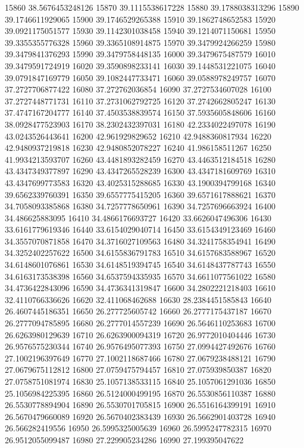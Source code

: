 {15860 38.5676453248126
15870 39.1115538617228
15880 39.1788038313296
15890 39.1746611929065
15900 39.1746529265388
15910 39.1862748652583
15920 39.0921175051577
15930 39.1142301038458
15940 39.1214071150681
15950 39.3355355776328
15960 39.3365108914875
15970 39.3479924266259
15980 39.3479841376293
15990 39.3479758448135
16000 39.3479675487579
16010 39.3479591724919
16020 39.3590898233141
16030 39.1448531221075
16040 39.0791847169779
16050 39.1082447733471
16060 39.0588978249757
16070 37.2727706877422
16080 37.272762036854
16090 37.2727534607028
16100 37.2727448771731
16110 37.2731062792725
16120 37.2742662805247
16130 37.4747167204777
16140 37.4503538839574
16150 37.5935605848606
16160 38.0928477523903
16170 38.2302432397031
16180 42.2334022497078
16190 43.0243526443641
16200 42.961929829652
16210 42.9488360817934
16220 42.9480937219818
16230 42.9480852078227
16240 41.986158511267
16250 41.9934213593707
16260 43.4481893282459
16270 43.4463512184518
16280 43.4347349377897
16290 43.4347265528239
16300 43.4347181609769
16310 43.4347699773583
16320 43.4025315288685
16330 43.1900394799168
16340 39.6562339760391
16350 39.6557775415205
16360 39.6571617888621
16370 34.7058093385868
16380 34.7257778650961
16390 34.7257696663924
16400 34.486625883095
16410 34.4866176693727
16420 33.6626047496306
16430 33.6161779619346
16440 33.6154029040714
16450 33.6154349123469
16460 34.3557070871858
16470 34.3716027109563
16480 34.3241758354941
16490 34.3252402257622
16500 34.6155836791783
16510 34.6157683588967
16520 34.6148601076861
16530 34.6148519394745
16540 34.6148437787743
16550 34.6163173538398
16560 34.6537594335935
16570 34.6611077561022
16580 34.4736422843096
16590 34.4736341319847
16600 34.2802221218403
16610 32.4110766336626
16620 32.411068462688
16630 28.2384451585843
16640 26.4607445186351
16650 26.277725605742
16660 26.2777175437187
16670 26.2777094785895
16680 26.2777014557239
16690 26.5646110253683
16700 26.6263980129639
16710 26.6263900094319
16720 26.9772010404446
16730 26.9576575230344
16740 26.9576495077393
16750 27.0994427492676
16760 27.1002196397649
16770 27.1002118687466
16780 27.0679238488121
16790 27.0679675112812
16800 27.0759475794457
16810 27.075939850387
16820 27.0758751081974
16830 25.1057138533115
16840 25.1057061291036
16850 25.1056984225395
16860 26.5124000499195
16870 26.5530856110387
16880 26.5530778894904
16890 26.5530701705815
16900 26.5516164399191
16910 26.5670479660089
16920 26.5670402383439
16930 26.5662901403728
16940 26.566282419556
16950 26.5995325005639
16960 26.5995247782315
16970 26.9512055099487
16980 27.229905234286
16990 27.199395047622
}
